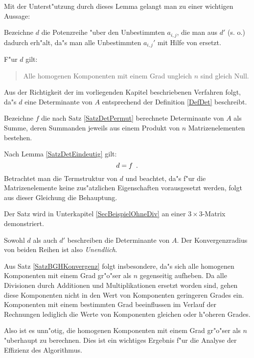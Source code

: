 Mit der Unterst"utzung durch dieses Lemma gelangt man zu einer
wichtigen Aussage:
\begin{satz}
\label{SatzBGHKonvergenz}
    Bezeichne $d$ die Potenzreihe "uber den Unbestimmten $a_{i,j}$, die
    man aus $d'$ (s. o.) dadurch erh"alt, da"s man alle 
    Unbestimmten $a_{i,j}'$ mit Hilfe von  
    ersetzt.

    F"ur $d$ gilt:
    \begin{quote}
         Alle homogenen Komponenten mit einem Grad ungleich $n$ sind
         gleich Null.
    \end{quote}
\end{satz}
\begin{beweis}
    Aus der Richtigkeit der im vorliegenden Kapitel beschriebenen Verfahren
    folgt, da"s $d$ eine Determinante von $A$ entsprechend der 
    Definition \ref{DefDet} beschreibt.

    Bezeichne $f$ die nach Satz \ref{SatzDetPermut} berechnete Determinante
    von $A$ als Summe, deren Summanden jeweils aus einem Produkt von $n$
    Matrizenelementen bestehen.

    Nach Lemma \ref{SatzDetEindeutig} gilt:
    \[
        d = f \mbox{\hspace{0.5em}.}
    \]
    Betrachtet man die Termstruktur von $d$ und beachtet, da"s f"ur die 
    Matrizenelemente keine zus"atzlichen Eigenschaften vorausgesetzt werden,
    folgt aus dieser Gleichung die Behauptung.
\end{beweis}
Der Satz wird in Unterkapitel \ref{SecBeispielOhneDiv} an einer
$3 \times 3$-Matrix demonstriert.

Sowohl $d$ als auch $d'$ beschreiben die Determinante von $A$. 
Der Konvergenzradius von beiden Reihen ist also {\em Unendlich}.

Aus Satz \ref{SatzBGHKonvergenz} folgt insbesondere, da"s sich alle 
homogenen Komponenten mit einem Grad gr"o"ser als $n$ gegenseitig aufheben.
Da alle Divisionen durch Additionen und Multiplikationen ersetzt worden 
sind, gehen diese Komponenten nicht in den Wert von Komponenten geringeren
Grades ein. Komponenten mit einem bestimmten Grad beeinflussen
im Verlauf der Rechnungen lediglich die Werte von Komponenten gleichen oder
h"oheren Grades. 

Also ist es unn"otig, die homogenen Komponenten mit einem Grad gr"o"ser
als $n$ "uberhaupt zu berechnen. Dies ist ein wichtiges Ergebnis f"ur die
Analyse der Effizienz des Algorithmus.


